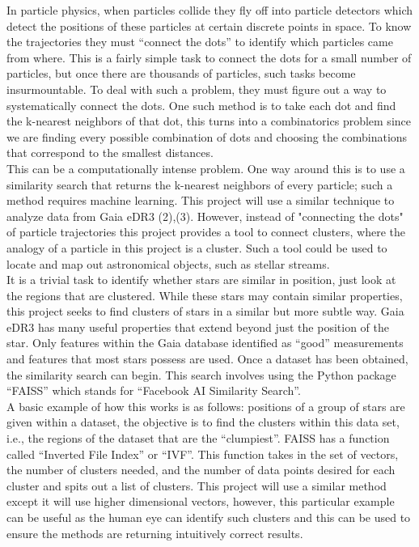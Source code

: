 \documentclass[notitlepage,nofootinbib,preprintnumbers,aps,prd]{revtex4-1}
\begin{document}
\indent In particle physics, when particles collide they fly off into particle detectors which detect
the positions of these particles at certain discrete points in space. To know the trajectories they
must “connect the dots” to identify which particles came from where. This is a fairly simple task
to connect the dots for a small number of particles, but once there are thousands of particles,
such tasks become insurmountable. To deal with such a problem, they must figure out a way to
systematically connect the dots. One such method is to take each dot and find the k-nearest
neighbors of that dot, this turns into a combinatorics problem since we are finding every possible
combination of dots and choosing the combinations that correspond to the smallest distances.\\

\indent This can be a computationally intense problem. One way around this is to use a similarity search
that returns the k-nearest neighbors of every particle; such a method requires machine learning.
This project will use a similar technique to analyze data from Gaia eDR3 (2),(3). However, instead of "connecting the dots" of particle trajectories this project provides a tool to connect clusters, where the analogy of a particle in this project is a cluster. Such a tool could be used to locate and map out astronomical objects, such as stellar streams.\\

\indent It is a trivial task to identify whether stars are similar in position, just look at the regions that are clustered.
While these stars may contain similar properties, this project seeks to find clusters of stars in a
similar but more subtle way. Gaia eDR3 has many useful properties that extend beyond just the
position of the star. Only features within the Gaia database identified as “good” measurements
and features that most stars possess are used. Once a dataset has been obtained, the similarity
search can begin. This search involves using the Python package “FAISS” which stands for
“Facebook AI Similarity Search”.\\

\indent A basic example of how this works is as follows: positions of a group of stars are given
within a dataset, the objective is to find the clusters within this data set, i.e., the regions of the
dataset that are the “clumpiest”. FAISS has a function called “Inverted File Index” or “IVF”. This
function takes in the set of vectors, the number of clusters needed, and the number of data points
desired for each cluster and spits out a list of clusters. This project will use a similar method except it will use higher dimensional vectors, however, this particular example can be useful as the
human eye can identify such clusters and this can be used to ensure the methods are returning
intuitively correct results.\\
\end{document}

